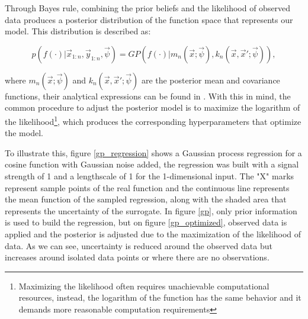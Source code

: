 \documentclass{article}
\begin{document}
Through Bayes rule, combining the prior beliefs and the likelihood of observed data produces a posterior distribution of the function space that represents our model. This distribution is described as\cite{Pandita2016}:

\begin{equation}
    p(f(\cdot)|\vec{x}_{1:n},\vec{y}_{1:n},\vec{\psi}) = GP(f(\cdot)|m_n(\vec{x};\vec{\psi}),k_n(\vec{x},\vec{x}';\vec{\psi})),
\end{equation}

where $m_n(\vec{x};\vec{\psi})$ and $k_n(\vec{x},\vec{x}';\vec{\psi})$ are the posterior mean and covariance functions, their analytical expressions can be found in \cite{Pandita2016}. With this in mind, the common procedure to adjust the posterior model is to maximize the logarithm of the likelihood\footnote{Maximizing the likelihood often requires unachievable computational resources, instead, the logarithm of the function has the same behavior and it demands more reasonable computation requirements}, which produces the corresponding hyperparameters that optimize the model.

To illustrate this, figure \ref{gp_regression} shows a Gaussian process regression for a cosine function with Gaussian noise added, the regression was built with a signal strength of 1 and a lengthscale of 1 for the 1-dimensional input. The "X" marks represent sample points of the real function and the continuous line represents the mean function of the sampled regression, along with the shaded area that represents the uncertainty of the surrogate. In figure \ref{gp}, only prior information is used to build the regression, but on figure \ref{gp_optimized}, observed data is applied and the posterior is adjusted due to the maximization of the likelihood of data. As we can see, uncertainty is reduced around the observed data but increases around isolated data points or where there are no observations.
\end{document}
